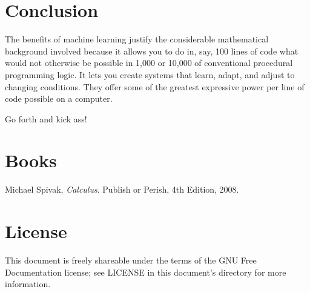 \documentclass{article}
\begin{document}
\section{Conclusion}

The benefits of machine learning justify the considerable mathematical
background involved because it allows you to do in, say, 100 lines of code what
would not otherwise be possible in 1,000 or 10,000 of conventional procedural
programming logic. It lets you create systems that learn, adapt, and adjust to
changing conditions. They offer some of the greatest expressive power per line
of code possible on a computer.

Go forth and kick ass!

\section{Books}

\begin{thebibliography}{9}

  Michael Spivak,
  \emph{Calculus}.
  Publish or Perish,
  4th Edition,
  2008.

\end{thebibliography}

\section{License}

This document is freely shareable under the terms of the GNU Free Documentation
license; see LICENSE in this document's directory for more information.
\end{document}
